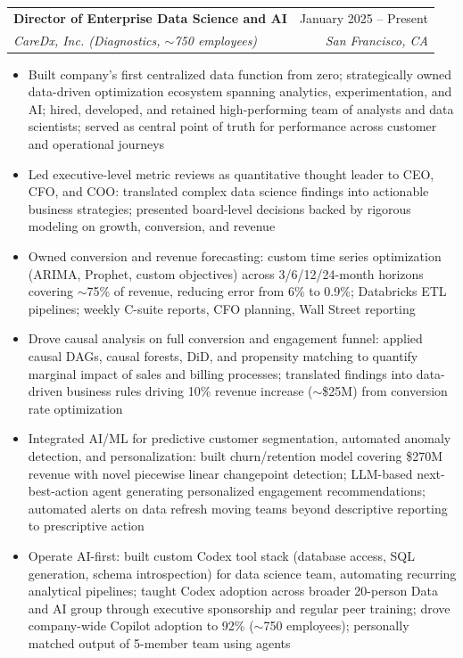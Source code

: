 \documentclass[letterpaper,11pt]{article}
\makeatletter
\newcommand{\resumeItem}[1]{
  \item\small{
    {#1 \vspace{-2pt}}
  }
}
\newcommand{\resumeSubheading}[4]{
  \vspace{-2pt}\item
    \begin{tabular*}{0.97\textwidth}[t]{l@{\extracolsep{\fill}}r}
      \textbf{#1} & #2 \\
      \textit{\small#3} & \textit{\small #4} \\
    \end{tabular*}\vspace{-7pt}
}
\newcommand{\resumeItemListStart}{\begin{itemize}}
\newcommand{\resumeItemListEnd}{\end{itemize}\vspace{-5pt}}
\makeatother
\begin{document}
    \resumeSubheading
      {Director of Enterprise Data Science and AI}{January 2025 -- Present}
      {CareDx, Inc. (Diagnostics, $\sim$750 employees)}{San Francisco, CA}
      \resumeItemListStart
        \resumeItem{Built company's first centralized data function from zero; strategically owned data-driven optimization ecosystem spanning analytics, experimentation, and AI; hired, developed, and retained high-performing team of analysts and data scientists; served as central point of truth for performance across customer and operational journeys}
        \resumeItem{Led executive-level metric reviews as quantitative thought leader to CEO, CFO, and COO: translated complex data science findings into actionable business strategies; presented board-level decisions backed by rigorous modeling on growth, conversion, and revenue}
        \resumeItem{Owned conversion and revenue forecasting: custom time series optimization (ARIMA, Prophet, custom objectives) across 3/6/12/24-month horizons covering $\sim$75\% of revenue, reducing error from 6\% to 0.9\%; Databricks ETL pipelines; weekly C-suite reports, CFO planning, Wall Street reporting}
        \resumeItem{Drove causal analysis on full conversion and engagement funnel: applied causal DAGs, causal forests, DiD, and propensity matching to quantify marginal impact of sales and billing processes; translated findings into data-driven business rules driving 10\% revenue increase ($\sim$\$25M) from conversion rate optimization}
        \resumeItem{Integrated AI/ML for predictive customer segmentation, automated anomaly detection, and personalization: built churn/retention model covering \$270M revenue with novel piecewise linear changepoint detection; LLM-based next-best-action agent generating personalized engagement recommendations; automated alerts on data refresh moving teams beyond descriptive reporting to prescriptive action}
        \resumeItem{Operate AI-first: built custom Codex tool stack (database access, SQL generation, schema introspection) for data science team, automating recurring analytical pipelines; taught Codex adoption across broader 20-person Data and AI group through executive sponsorship and regular peer training; drove company-wide Copilot adoption to 92\% ($\sim$750 employees); personally matched output of 5-member team using agents}
      \resumeItemListEnd
\end{document}

